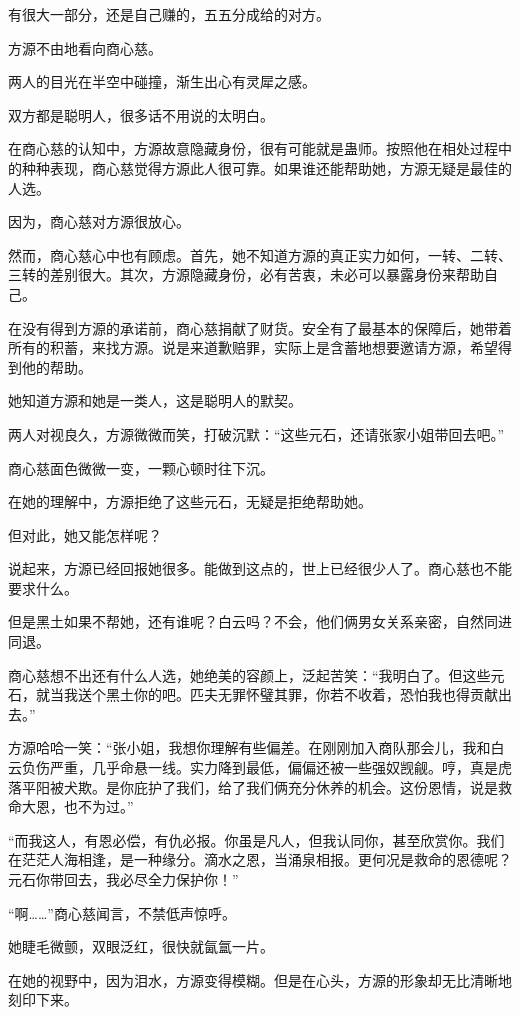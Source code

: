 \begin{this_body}
有很大一部分，还是自己赚的，五五分成给的对方。

方源不由地看向商心慈。

两人的目光在半空中碰撞，渐生出心有灵犀之感。

双方都是聪明人，很多话不用说的太明白。

在商心慈的认知中，方源故意隐藏身份，很有可能就是蛊师。按照他在相处过程中的种种表现，商心慈觉得方源此人很可靠。如果谁还能帮助她，方源无疑是最佳的人选。

因为，商心慈对方源很放心。

然而，商心慈心中也有顾虑。首先，她不知道方源的真正实力如何，一转、二转、三转的差别很大。其次，方源隐藏身份，必有苦衷，未必可以暴露身份来帮助自己。

在没有得到方源的承诺前，商心慈捐献了财货。安全有了最基本的保障后，她带着所有的积蓄，来找方源。说是来道歉赔罪，实际上是含蓄地想要邀请方源，希望得到他的帮助。

她知道方源和她是一类人，这是聪明人的默契。

两人对视良久，方源微微而笑，打破沉默：“这些元石，还请张家小姐带回去吧。”

商心慈面色微微一变，一颗心顿时往下沉。

在她的理解中，方源拒绝了这些元石，无疑是拒绝帮助她。

但对此，她又能怎样呢？

说起来，方源已经回报她很多。能做到这点的，世上已经很少人了。商心慈也不能要求什么。

但是黑土如果不帮她，还有谁呢？白云吗？不会，他们俩男女关系亲密，自然同进同退。

商心慈想不出还有什么人选，她绝美的容颜上，泛起苦笑：“我明白了。但这些元石，就当我送个黑土你的吧。匹夫无罪怀璧其罪，你若不收着，恐怕我也得贡献出去。”

方源哈哈一笑：“张小姐，我想你理解有些偏差。在刚刚加入商队那会儿，我和白云负伤严重，几乎命悬一线。实力降到最低，偏偏还被一些强奴觊觎。哼，真是虎落平阳被犬欺。是你庇护了我们，给了我们俩充分休养的机会。这份恩情，说是救命大恩，也不为过。”

“而我这人，有恩必偿，有仇必报。你虽是凡人，但我认同你，甚至欣赏你。我们在茫茫人海相逢，是一种缘分。滴水之恩，当涌泉相报。更何况是救命的恩德呢？元石你带回去，我必尽全力保护你！”

“啊……”商心慈闻言，不禁低声惊呼。

她睫毛微颤，双眼泛红，很快就氤氲一片。

在她的视野中，因为泪水，方源变得模糊。但是在心头，方源的形象却无比清晰地刻印下来。

\end{this_body}

